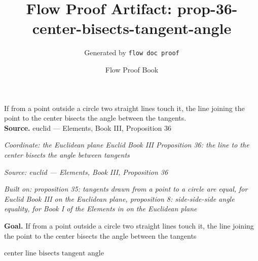 \documentclass[11pt]{article}
\title{Flow Proof Artifact: prop-36-center-bisects-tangent-angle}
\author{Generated by \texttt{flow doc proof}}
\date{Flow Proof Book}
\theoremstyle{definition}
\begin{document}
\maketitle
If from a point outside a circle two straight lines touch it, the line joining the point to the center bisects the angle between the tangents.\\[0.5em]
\textbf{Source.} euclid — Elements, Book III, Proposition 36\\[0.5em]
\bigskip
{}\par
\smallskip\noindent\textit{Coordinate: the Euclidean plane \cdot Euclid Book III \cdot Proposition 36: the line to the center bisects the angle between tangents}\par
\smallskip\noindent\textit{Source: euclid — Elements, Book III, Proposition 36}\par
\smallskip\noindent\textit{Built on: proposition 35: tangents drawn from a point to a circle are equal, for Euclid Book III on the Euclidean plane, proposition 8: side-side-side angle equality, for Book I of the Elements in on the Euclidean plane}\par
\medskip
\noindent\textbf{Goal.} If from a point outside a circle two straight lines touch it, the line joining the point to the center bisects the angle between the tangents\par
\noindent$\displaystyle \text{center line bisects tangent angle}$\par
\medskip
\noindent
\end{document}
